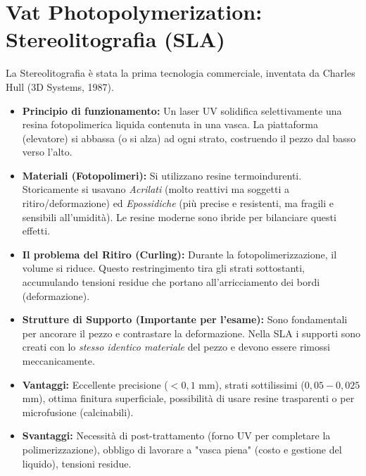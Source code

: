 \section{Vat Photopolymerization: Stereolitografia (SLA)}
La Stereolitografia è stata la prima tecnologia commerciale, inventata da Charles Hull (3D Systems, 1987).
\begin{itemize}
    \item \textbf{Principio di funzionamento:} Un laser UV solidifica selettivamente una resina fotopolimerica liquida contenuta in una vasca. La piattaforma (elevatore) si abbassa (o si alza) ad ogni strato, costruendo il pezzo dal basso verso l'alto.
    \item \textbf{Materiali (Fotopolimeri):} Si utilizzano resine termoindurenti. Storicamente si usavano \textit{Acrilati} (molto reattivi ma soggetti a ritiro/deformazione) ed \textit{Epossidiche} (più precise e resistenti, ma fragili e sensibili all'umidità). Le resine moderne sono ibride per bilanciare questi effetti.
    \item \textbf{Il problema del Ritiro (Curling):} Durante la fotopolimerizzazione, il volume si riduce. Questo restringimento tira gli strati sottostanti, accumulando tensioni residue che portano all'arricciamento dei bordi (deformazione).
    \item \textbf{Strutture di Supporto (Importante per l'esame):} Sono fondamentali per ancorare il pezzo e contrastare la deformazione. Nella SLA i supporti sono creati con lo \textit{stesso identico materiale} del pezzo e devono essere rimossi meccanicamente.
    \item \textbf{Vantaggi:} Eccellente precisione ($<0,1$ mm), strati sottilissimi ($0,05 - 0,025$ mm), ottima finitura superficiale, possibilità di usare resine trasparenti o per microfusione (calcinabili).
    \item \textbf{Svantaggi:} Necessità di post-trattamento (forno UV per completare la polimerizzazione), obbligo di lavorare a "vasca piena" (costo e gestione del liquido), tensioni residue.
\end{itemize}

